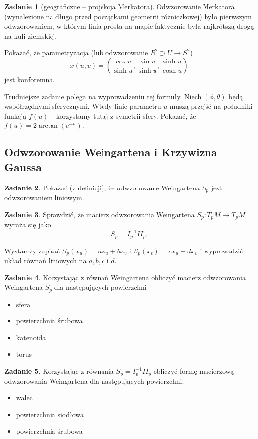 \documentclass[a4paper,11pt]{article}
\theoremstyle{definition}\newtheorem{exercise}{Zadanie}
\theoremstyle{definition}\newtheorem{remark}{Uwaga}
\begin{document}
\begin{exercise}[geograficzne -- projekcja Merkatora]
 Odwzorowanie Merkatora (wynalezione na długo przed początkami geometrii 
r\'ożniczkowej) było pierwszym odwzorowaniem, w kt\'orym linia prosta na mapie 
faktycznie była najkr\'otszą drogą na kuli ziemskiej.

Pokazać, że parametryzacja (lub odwzorowanie $R^2 \supset U \to S^2$)
\[x(u,v)=\left( \frac{\cos v}{\sinh u}, \frac{\sin v}{\sinh u}, 
\frac{\sinh u}{\cosh u}\right)\]
jest konforemna.

\small{Trudniejsze zadanie polega na wyprowadzeniu tej formuły. Niech 
$(\phi,\theta)$ będą wsp\'ołrzędnymi sferycznymi. Wtedy linie parametru $u$ 
muszą przejść na południki funkcją $f(u)$ -- korzystamy tutaj z symetrii sfery. 
Pokazać, że $f(u)=2\arctan(e^{-u})$.}

\end{exercise}


\subsection{Odwzorowanie Weingartena i Krzywizna Gaussa}
\begin{exercise}
Pokazać (z definicji), że odwzorowanie Weingartena $S_p$ jest odwzorowaniem 
liniowym.
\end{exercise}

\begin{exercise}
 Sprawdzić, że macierz odwzorowania Weingartena $S_p \colon T_p 
M \to T_p M$ wyraża się jako
\[S_p = I_p^{-1} II_p. \]
 
 \small{Wystarczy zapisać $S_p(x_u)=ax_u + bx_v$ i $S_p(x_v)=cx_u + d x_v$ i 
wyprowadzić układ r\'ownań liniowych na $a,b,c$ i $d$.}
\end{exercise}

\begin{exercise}
Korzystając z r\'ownań Weingartena obliczyć macierz odwzorowania Weingartena
$S_p$ dla następujących powierzchni
\begin{itemize}
 \item sfera
 \item powierzchnia śrubowa
 \item katenoida
 \item torus
\end{itemize}

\end{exercise}

\begin{exercise}
Korzystając z r\'ownania $S_p = I_p^{-1} II_p$ obliczyć formę macierzową 
odwzorowania Weingartena dla następujących powierzchni:
\begin{itemize}
 \item walec
 \item powierzchnia siodłowa
 \item powierzchnia śrubowa
\end{itemize}

\end{exercise}
\end{document}
